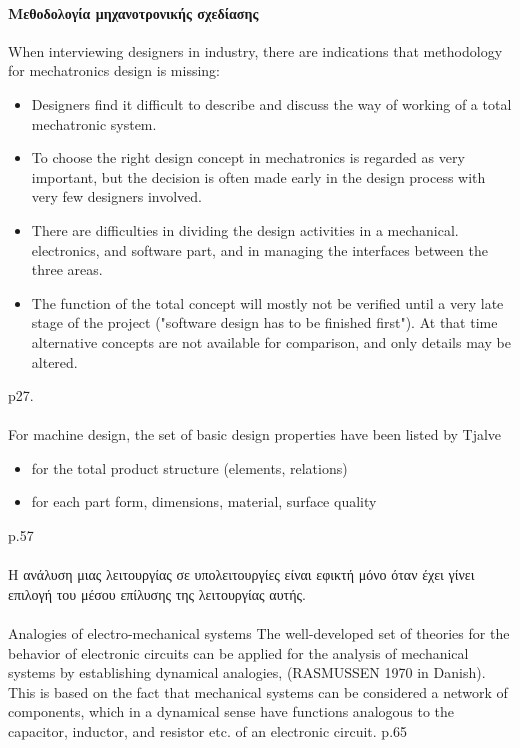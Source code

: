 \documentclass[a4paper,12pt,twoside]{report}
\begin{document}
{			\paragraph{Μεθοδολογία μηχανοτρονικής σχεδίασης}{When interviewing designers in industry, there are indications that methodology for mechatronics design is missing:
			\begin{itemize}
				\item Designers find it difficult to describe and discuss the way of working of a total mechatronic system.
				\item To choose the right design concept in mechatronics is regarded as very important, but the decision is often made early in the design process with very few designers involved.
				\item There are difficulties in dividing the design activities in a mechanical. electronics, and software part, and in managing the interfaces between the three areas.
				\item The function of the total concept will mostly not be verified until a very late stage of the project ("software design has to be finished first"). At that time alternative concepts are not available for comparison, and only details may be altered.
			\end{itemize}
			\cite{ATheoreticalApproachOnMechatronicsDesign:Buur1990} p27.
			}
			
			\paragraph{} {For machine design, the set of basic design properties have been listed by Tjalve \cite{AShortCourseInIndustrialDesign:Tjalve1979}
			\begin{itemize}
				\item for the total product structure (elements, relations)
				\item for each part form, dimensions, material, surface quality
			\end{itemize}
			\cite{ATheoreticalApproachOnMechatronicsDesign:Buur1990} p.57
			}
			
			\paragraph{} {Η ανάλυση μιας λειτουργίας σε υπολειτουργίες είναι εφικτή μόνο όταν έχει γίνει επιλογή του μέσου επίλυσης της λειτουργίας αυτής.
			
			}
			
			\paragraph{} {Analogies of electro-mechanical systems The well-developed set of theories for the behavior of electronic circuits can be applied
for the analysis of mechanical systems by establishing dynamical analogies, (RASMUSSEN 1970 in Danish). This is based on the fact that mechanical systems can be considered a network of components, which in a dynamical sense have functions analogous to the capacitor, inductor, and resistor etc. of an electronic circuit. \cite{ATheoreticalApproachOnMechatronicsDesign:Buur1990} p.65			
			}
			
}
\end{document}

